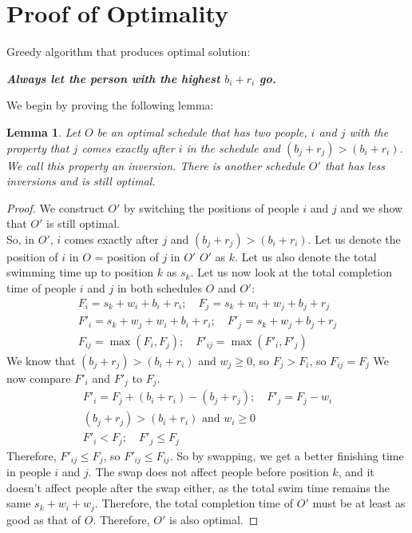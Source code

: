 \documentclass[a4paper,11pt]{article}
\newtheorem{lemma}[theorem]{Lemma}
\begin{document}
\section{Proof of Optimality}
Greedy algorithm that produces optimal solution:
\begin{center}
    \textbf{\textit{Always let the person with the highest $b_i + r_i$ go.}}
\end{center}
We begin by proving the following lemma:
\begin{lemma}\label{lem:swap}
    Let $O$ be an optimal schedule that has two people, $i$ and $j$ with the property that $j$ comes exactly after $i$ in the schedule and $(b_j + r_j) > (b_i + r_i)$. We call this property an inversion. There is another schedule $O'$ that has less inversions and is still optimal.
\end{lemma}
\begin{proof}
    We construct $O'$ by switching the positions of people $i$ and $j$ and we show that $O'$ is still optimal.\\
    So, in $O'$, $i$ comes exactly after $j$ and $(b_j + r_j) > (b_i + r_i)$. Let us denote the position of $i$ in $O$ = position of $j$ in $O'$ $O'$ as $k$. Let us also denote the total swimming time up to position $k$ as $s_k$. Let us now look at the total completion time of people $i$ and $j$ in both schedules $O$ and $O'$:
    \begin{align*}
    F_i = s_k + w_i + b_i + r_i; \quad F_j = s_k + w_i + w_j + b_j + r_j\\
    F'_i = s_k + w_j + w_i + b_i + r_i; \quad F'_j = s_k + w_j +b_j + r_j\\
    F_{ij} = \max(F_i, F_j); \quad F'_{ij} = \max(F'_i, F'_j)
    \end{align*}
    We know that $(b_j + r_j) > (b_i + r_i)$ and $w_j \ge 0$, so $F_j > F_i$, so $F_{ij} = F_j$
    We now compare $F'_i$ and $F'_j$ to $F_j$.
    \begin{align*}
        F'_i = F_j + (b_i + r_i) - (b_j + r_j); \quad F'_j = F_j - w_i\\
        (b_j + r_j) > (b_i + r_i) \text{ and } w_i \ge 0\\
        F'_i < F_j; \quad F'_j \leq F_j
    \end{align*}
    Therefore, $F'_{ij} \leq F_j$, so $F'_{ij} \leq F_{ij}$. So by swapping, we get a better finishing time in people $i$ and $j$. The swap does not affect people before position $k$, and it doesn't affect people after the swap either, as the total swim time remains the same $s_k + w_i + w_j$. Therefore, the total completion time of $O'$ must be at least as good as that of $O$. Therefore, $O'$ is also optimal.
\end{proof}
\end{document}
